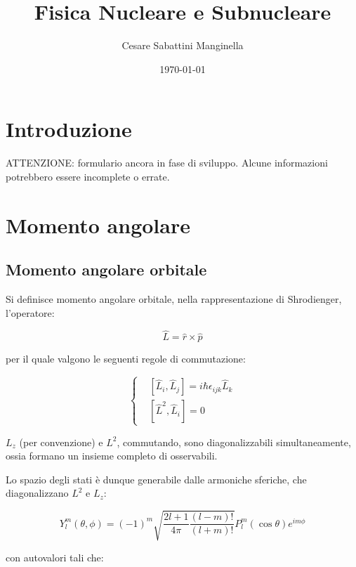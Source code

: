 \documentclass{article}
\title{Fisica Nucleare e Subnucleare}
\author{Cesare Sabattini Manginella}
\date{\today}
\begin{document}
\maketitle

\begin{abstract}

\end{abstract}


\section{Introduzione}
ATTENZIONE: formulario ancora in fase di sviluppo. Alcune informazioni potrebbero essere incomplete o errate.

\section{Momento angolare}
\subsection{Momento angolare orbitale}
Si definisce momento angolare orbitale, nella rappresentazione di Shrodienger, l'operatore:

\begin{equation}
    \hat{L}=\hat{r}\times\hat{p}
\end{equation}

per il quale valgono le seguenti regole di commutazione:

\begin{equation}
    \left\{
    \begin{aligned}
         & [\hat{L}_i,\hat{L}_j]=i\hbar\epsilon_{ijk}\hat{L}_k \\
         & [\hat{L}^2,\hat{L}_i]=0
    \end{aligned}
    \right.
\end{equation}

$L_z$ (per convenzione) e $L^2$, commutando, sono diagonalizzabili simultaneamente, ossia formano un insieme completo di osservabili.

Lo spazio degli stati è dunque generabile dalle armoniche sferiche, che diagonalizzano $L^2$ e $L_z$:

\begin{equation}
    Y^m_l(\theta,\phi)=(-1)^m\sqrt{\frac{2l+1}{4\pi}\frac{(l-m)!}{(l+m)!}}P^m_l(\cos\theta)e^{im\phi}
\end{equation}

con autovalori tali che:
\end{document}

